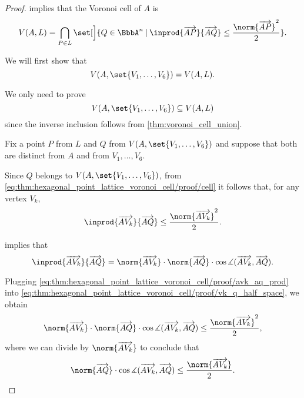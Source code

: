 \begin{proof}
   implies that the Voronoi cell of \( A \) is
  \begin{equation}\label{eq:thm:hexagonal_point_lattice_voronoi_cell/proof/cell}
    V(A, L) = \bigcap_{P \in L} \set[\Big]{ Q \in \BbbA^n \given \inprod {\vect{AP}} {\vect{AQ}} \leq \frac {\norm{\vect{AP}}^2} 2 }.
  \end{equation}

   We will first show that
  \begin{equation*}
    V(A, \set{ V_1, \ldots, V_6 }) = V(A, L).
  \end{equation*}

  We only need to prove
  \begin{equation*}
    V(A, \set{ V_1, \ldots, V_6 }) \subseteq V(A, L)
  \end{equation*}
  since the inverse inclusion follows from \cref{thm:voronoi_cell_union}.

  Fix a point \( P \) from \( L \) and \( Q \) from \( V(A, \set{ V_1, \ldots, V_6 }) \) and suppose that both are distinct from \( A \) and from \( V_1, \ldots, V_6 \).

  Since \( Q \) belongs to \( V(A, \set{ V_1, \ldots, V_6 }) \), from \eqref{eq:thm:hexagonal_point_lattice_voronoi_cell/proof/cell} it follows that, for any vertex \( V_k \),
  \begin{equation}\label{eq:thm:hexagonal_point_lattice_voronoi_cell/proof/vk_q_half_space}
    \inprod {\vect{AV_k}} {\vect{AQ}} \leq \frac {\norm{\vect{AV_k}}^2} 2.
  \end{equation}

   implies that
  \begin{equation}\label{eq:thm:hexagonal_point_lattice_voronoi_cell/proof/avk_aq_prod}
    \inprod {\vect{AV_k}} {\vect{AQ}}
    =
    \norm{\vect{AV_k}} \cdot \norm{\vect{AQ}} \cdot \cos\measuredangle(\vect{AV_k}, \vect{AQ}).
  \end{equation}

  Plugging \eqref{eq:thm:hexagonal_point_lattice_voronoi_cell/proof/avk_aq_prod} into \eqref{eq:thm:hexagonal_point_lattice_voronoi_cell/proof/vk_q_half_space}, we obtain
  \begin{equation*}
    \norm{\vect{AV_k}} \cdot \norm{\vect{AQ}} \cdot \cos\measuredangle(\vect{AV_k}, \vect{AQ}) \leq \frac {\norm{\vect{AV_k}}^2} 2,
  \end{equation*}
  where we can divide by \( \norm{\vect{AV_k}} \) to conclude that
  \begin{equation}\label{eq:thm:hexagonal_point_lattice_voronoi_cell/proof/aq_cos_avk_ineq}
    \norm{\vect{AQ}} \cdot \cos\measuredangle(\vect{AV_k}, \vect{AQ}) \leq \frac {\norm{\vect{AV_k}}} 2.
  \end{equation}


\end{proof}
